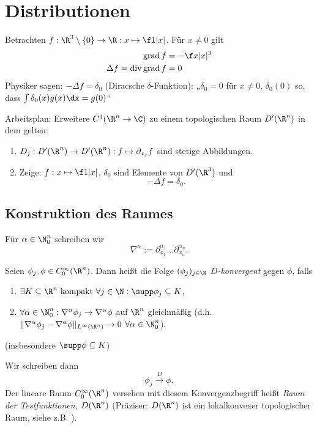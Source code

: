 
\chapter{Distributionen}


Betrachten $f : \R^3 \setminus \{0\} \to \R : x \mapsto \f 1{|x|}$.
Für $x \neq 0$ gilt
\begin{align*}
	\grad f &= - \f x{|x|^3} \\
	\Delta f = \div \grad f &= 0
\end{align*}
Physiker sagen: $-\Delta f = \delta_0$ (Diracsche $\delta$-Funktion):
„$\delta_0 = 0$ für $x \neq 0$, $\delta_0(0)$ so, dass $\int \delta_0(x)g(x) \dx = g(0)$“

Arbeitsplan: Erweitere $C^1(\R^n \to \C)$ zu einem topologischen Raum $D'(\R^n)$ in dem gelten:
\begin{enumerate}[1)]
	\item
		$D_j : D'(\R^n) \to D'(\R^n) : f \mapsto \partial_{x_j} f$ sind stetige Abbildungen.
	\item
		Zeige: $f : x \mapsto \f 1{|x|}$, $\delta_0$ sind Elemente von $D'(\R^3)$ und
		\[
			-\Delta f = \delta_0.
		\]
\end{enumerate}


\section{Konstruktion des Raumes}


\begin{conv} \label{5.1}
	Für $\alpha \in \N_0^n$ schreiben wir
	\[
		\nabla^\alpha := \partial_{x_1}^{\alpha_1} \dotso \partial_{x_n}^{\alpha_n}.
	\]
\end{conv}

\begin{df} \label{5.2}
	Seien $\phi_j, \phi \in C_0^\infty(\R^n)$.
	Dann heißt die Folge $(\phi_j)_{j\in \N}$ \emph{$D$-konvergent} gegen $\phi$, falls
	\begin{enumerate}[1)]
		\item
			$\exists K \subset \R^n \text{ kompakt } \forall j \in \N: \supp \phi_j \subset K$,
		\item
			$\forall \alpha \in \N_0^n: \nabla^{\alpha} \phi_j \to \nabla^\alpha \phi$ auf $\R^n$ gleichmäßig (d.h. $\|\nabla^\alpha \phi_j - \nabla^\alpha \phi\|_{L^\infty(\R^n)} \to 0$ $\forall \alpha \in \N_0^n$).
	\end{enumerate}
	(insbesondere $\supp \phi \subset K$)

	Wir schreiben dann
	\[
		\phi_j \overset{D} \longrightarrow \phi.
	\]
	Der lineare Raum $C_0^\infty(\R^n)$ versehen mit diesem Konvergenzbegriff heißt \emph{Raum der Testfunktionen, $D(\R^n)$}  (Präziser: $D(\R^n)$  ist ein lokalkonvexer topologischer Raum, siehe z.B. \cite{Reed-Simon}).
\end{df}

